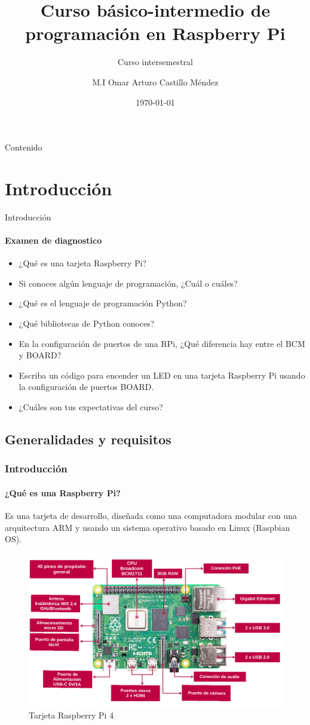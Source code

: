 \documentclass{beamer}
\title{Curso básico-intermedio de programación en Raspberry Pi}
\subtitle{Curso intersemestral}
\date{\today}
\author[OACM]{M.I Omar Arturo Castillo Méndez}
\begin{document}
	
	\begin{frame}[plain]
		\titlepage
	\end{frame}
	
	\begin{frame}{Contenido}
		\tableofcontents
	\end{frame}
	
	\section{Introducción}
	
	\begin{frame}{Introducción}
		\framesubtitle{Examen de diagnostico}
		\begin{itemize}
			\item ¿Qué es una tarjeta Raspberry Pi?
			\item Si conoces algún lenguaje de programación, ¿Cuál o cuáles?
			\item ¿Qué es el lenguaje de programación Python?
			\item ¿Qué bibliotecas de Python conoces?
			\item En la configuración de puertos de una RPi, ¿Qué diferencia hay entre el BCM y BOARD?
			\item Escriba un código para encender un LED en una tarjeta Raspberry Pi usando la configuración de puertos BOARD.
			\item ¿Cuáles son tus expectativas del curso?
		\end{itemize}
	\end{frame}
	\subsection{Generalidades y requisitos}
	\begin{frame}
		\frametitle{Introducción}
		\framesubtitle{¿Qué es una Raspberry Pi?}
		Es una tarjeta de desarrollo, diseñada como una computadora modular con una arquitectura ARM y usando un sistema operativo basado en Linux (Raspbian OS).
		\begin{figure}
			\includegraphics[scale=0.4]{rpiboard}
			\caption{Tarjeta Raspberry Pi 4}
		\end{figure}
		
	\end{frame}	
\end{document}
